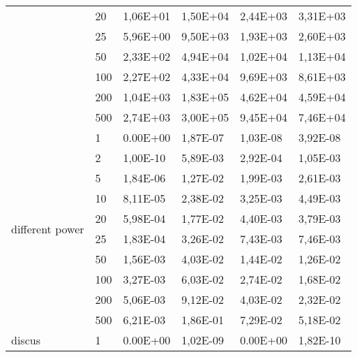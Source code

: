 \begin{longtable}[c]{|p{3.5cm}|l|l|l|l|l|}
                                        & 20        & 1,06E+01   & 1,50E+04   & 2,44E+03   & 3,31E+03  \\ \cline{2-6} 
                                        & 25        & 5,96E+00   & 9,50E+03   & 1,93E+03   & 2,60E+03  \\ \cline{2-6} 
                                        & 50        & 2,33E+02   & 4,94E+04   & 1,02E+04   & 1,13E+04  \\ \cline{2-6} 
                                        & 100       & 2,27E+02   & 4,33E+04   & 9,69E+03   & 8,61E+03  \\ \cline{2-6} 
                                        & 200       & 1,04E+03   & 1,83E+05   & 4,62E+04   & 4,59E+04  \\ \cline{2-6} 
                                        & 500       & 2,74E+03   & 3,00E+05   & 9,45E+04   & 7,46E+04  \\ \hline
\multirow[t]{10}{*}{different power}       & 1         & 0.00E+00   & 1,87E-07   & 1,03E-08   & 3,92E-08  \\ \cline{2-6} 
                                        & 2         & 1,00E-10   & 5,89E-03   & 2,92E-04   & 1,05E-03  \\ \cline{2-6} 
                                        & 5         & 1,84E-06   & 1,27E-02   & 1,99E-03   & 2,61E-03  \\ \cline{2-6} 
                                        & 10        & 8,11E-05   & 2,38E-02   & 3,25E-03   & 4,49E-03  \\ \cline{2-6} 
                                        & 20        & 5,98E-04   & 1,77E-02   & 4,40E-03   & 3,79E-03  \\ \cline{2-6} 
                                        & 25        & 1,83E-04   & 3,26E-02   & 7,43E-03   & 7,46E-03  \\ \cline{2-6} 
                                        & 50        & 1,56E-03   & 4,03E-02   & 1,44E-02   & 1,26E-02  \\ \cline{2-6} 
                                        & 100       & 3,27E-03   & 6,03E-02   & 2,74E-02   & 1,68E-02  \\ \cline{2-6} 
                                        & 200       & 5,06E-03   & 9,12E-02   & 4,03E-02   & 2,32E-02  \\ \cline{2-6} 
                                        & 500       & 6,21E-03   & 1,86E-01   & 7,29E-02   & 5,18E-02  \\ \hline
\multirow[t]{10}{*}{discus}                & 1         & 0.00E+00   & 1,02E-09   & 0.00E+00   & 1,82E-10  \\ \cline{2-6} 

\end{longtable}
